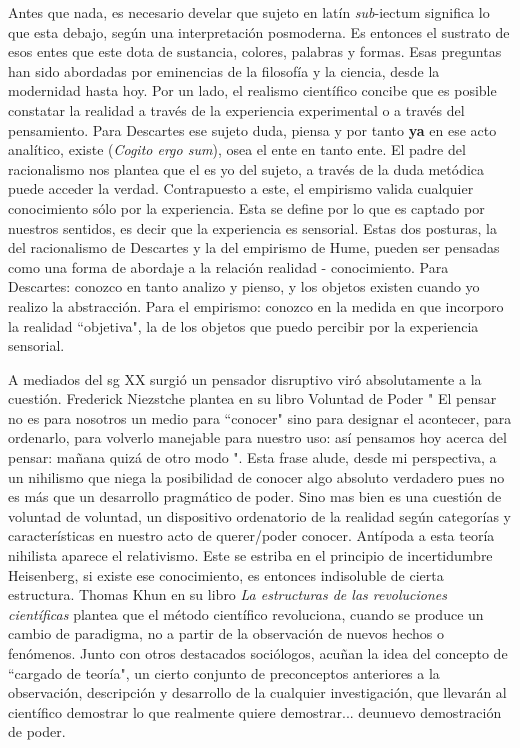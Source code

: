 Antes que nada, es necesario develar que sujeto en latín \emph{sub}-{iectum} significa lo que esta debajo, según una interpretación posmoderna. Es entonces el sustrato de esos entes que este dota de sustancia, colores, palabras y formas. Esas preguntas han sido abordadas por eminencias de la filosofía y la ciencia, desde la modernidad hasta hoy. Por un lado, el realismo científico concibe que es posible constatar la realidad a través de la experiencia experimental o a través del pensamiento. Para Descartes ese sujeto duda, piensa y por tanto \textbf{ya} en ese acto analítico, existe (\emph{Cogito ergo sum})\cite{descartes2004discurso}, osea el ente en tanto ente. El padre del racionalismo nos plantea que el es yo del sujeto, a través de la duda metódica puede acceder la verdad. Contrapuesto a este, el empirismo valida cualquier conocimiento sólo por la experiencia. Esta se define por lo que es captado por nuestros sentidos, es decir que la experiencia es sensorial. Estas dos posturas, la del racionalismo de Descartes y la del empirismo de Hume, pueden ser pensadas como una forma de abordaje a la relación realidad - conocimiento. Para Descartes: conozco en tanto analizo y pienso, y los objetos existen cuando yo realizo la abstracción. Para el empirismo: conozco en la medida en que incorporo la realidad ``objetiva", la de los objetos que puedo percibir por la experiencia sensorial. 

A mediados del sg XX surgió un pensador disruptivo viró absolutamente a la cuestión. Frederick Niezstche plantea en su libro Voluntad de Poder \cite{nietzsche2018voluntad}" El pensar no es para nosotros un medio para ``conocer" sino para designar el acontecer, para ordenarlo, para volverlo manejable para nuestro uso: así pensamos hoy acerca del pensar: mañana quizá de otro modo ". Esta frase alude, desde mi perspectiva, a un nihilismo que niega la posibilidad de conocer algo absoluto verdadero pues no es más que un desarrollo pragmático de poder. Sino mas bien es una cuestión de voluntad de voluntad, un dispositivo ordenatorio de la realidad según categorías y características en nuestro acto de querer/poder conocer. Antípoda a esta teoría nihilista aparece el relativismo. Este se estriba en el principio de incertidumbre Heisenberg, si existe ese conocimiento, es entonces indisoluble de cierta estructura. Thomas Khun en su libro \emph{La estructuras de las revoluciones científicas} \cite{kuhn2019estructura} plantea que el método científico revoluciona, cuando se produce un cambio de paradigma, no a partir de la observación de nuevos hechos o fenómenos. Junto con otros destacados sociólogos, acuñan la idea del concepto de ``cargado de teoría", un cierto conjunto de preconceptos anteriores a la observación, descripción y desarrollo de la cualquier investigación, que llevarán al científico demostrar lo que realmente quiere demostrar... deunuevo demostración de poder.

